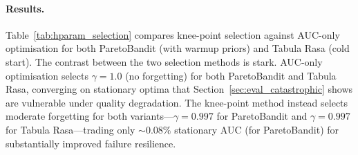 \paragraph{Results.}
Table~\ref{tab:hparam_selection} compares knee-point selection
against AUC-only optimisation for both ParetoBandit (with warmup
priors) and Tabula Rasa (cold start).
The contrast between the two selection methods is stark.
AUC-only optimisation selects $\gamma{=}1.0$ (no forgetting) for
both ParetoBandit and Tabula Rasa, converging on stationary optima
that Section~\ref{sec:eval_catastrophic} shows are vulnerable under
quality degradation.
The knee-point method instead selects moderate forgetting for both
variants---$\gamma{=}0.997$ for ParetoBandit and $\gamma{=}0.997$
for Tabula Rasa---trading only ${\sim}0.08\%$ stationary AUC (for
ParetoBandit) for substantially improved failure resilience.

\begin{table}[t]
\centering
\caption{%
  \textbf{$T_{\text{adapt}}$-constrained Pareto knee-point selection.}
  The knee-point method selects moderate forgetting ($\gamma{=}\hpParetoBanditGamma$ / $\hpTabulaGamma$) for both variants, while AUC-only optimisation favours near-stationary $\gamma$.
  Warmup priors yield higher AUC, higher Phase-2 reward, and lower variance than the cold-start baseline.
  Grid: $\hpGridAlpha$~$\alpha$ $\times$ $\hpGridGamma$~$\gamma$ values; val split, 20~seeds.%
}
\label{tab:hparam_selection}
\scriptsize
\setlength{\tabcolsep}{3pt}
\vspace{4pt}
\end{table}

